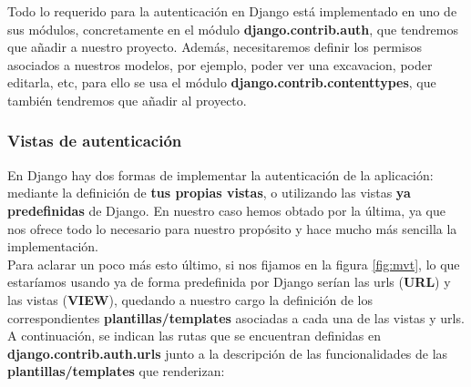 Todo lo requerido para la autenticación en Django está implementado en uno de sus módulos,
concretamente en el módulo \textbf{django.contrib.auth}, que tendremos que añadir a
nuestro proyecto. Además, necesitaremos definir los permisos asociados a nuestros modelos,
por ejemplo, poder ver una excavacion, poder editarla, etc, para ello se usa el módulo
\textbf{django.contrib.contenttypes}, que también tendremos que añadir al proyecto.

\subsubsection{Vistas de autenticación}
En Django hay dos formas de implementar la autenticación de la aplicación: mediante la
definición de \textbf{tus propias vistas}, o utilizando las vistas \textbf{ya predefinidas}
de Django. En nuestro caso hemos obtado por la última, ya que nos ofrece todo lo necesario
para nuestro propósito y hace mucho más sencilla la implementación.\\

Para aclarar un poco más esto último, si nos fijamos en la figura \ref{fig:mvt}, lo que
estaríamos usando ya de forma predefinida por Django serían las urls (\textbf{URL}) y las
vistas (\textbf{VIEW}), quedando a nuestro cargo la definición de los correspondientes
\textbf{plantillas/templates} asociadas a cada una de las vistas y urls.\\

A continuación, se indican las rutas que se encuentran definidas en
\textbf{django.contrib.auth.urls} junto a la descripción de las funcionalidades de las
\textbf{plantillas/templates} que renderizan:

